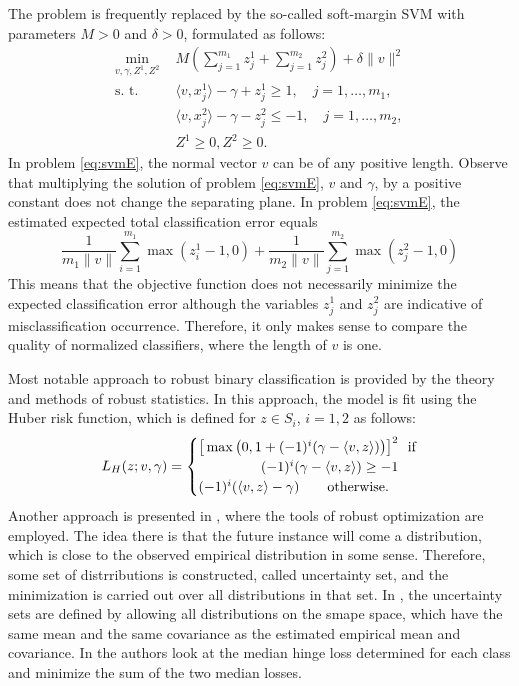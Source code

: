 \documentclass[10pt,letterpaper]{article}
\newcommand{\1}{1{\hskip -2.55 pt}\hbox{I}}
\begin{document}
The problem is frequently replaced by the so-called soft-margin SVM with parameters $M>0$ and $\delta>0$, formulated as follows:
\begin{equation}
\label{eq:svmE}
\begin{aligned}
\min_{v,\gamma,Z^1,Z^2}\, &\,  M \left( \sum_{j=1}^{m_1} z_j^1 + \sum_{j=1}^{m_2} z_j^2 \right)+\delta\|v\|^2  \\
\text{s. t. }\, & \, \langle v, x_j^1\rangle - \gamma + z_j^1 \ge 1, \quad j=1,\dots,m_1,\\
&\, \langle v, x_{j}^2\rangle -\gamma  - z_{j}^2 \le -1, \quad j=1,\dots,m_2,\\
&\, Z^1\ge 0, Z^2\geq 0.
\end{aligned}
\end{equation} 
In problem \eqref{eq:svmE}, the normal vector $v$ can be of any positive length. Observe that multiplying the solution of problem
\eqref{eq:svmE}, $v$ and $\gamma$, by a positive constant does not change the separating plane. 
In problem \eqref{eq:svmE}, the estimated expected total classification error equals
\[
 \frac{1}{m_1\|v\|} \sum_{i=1}^{m_1} \max (z_i^1-1, 0) + \frac{1}{m_2\|v\|} \sum_{j=1}^{m_2} \max (z_j^2-1, 0)
\]
This means that the objective function does not necessarily minimize the expected classification error although the variables $z^1_j$ and $z^2_j$ are indicative of misclassification occurrence. Therefore, it only makes sense to compare the quality of normalized classifiers, where the length of $v$ is one.


Most notable approach to robust binary classification is provided by the theory and methods of robust statistics. In this approach, the model is fit using the Huber risk function, which is defined for $z\in S_i$, $i=1,2$ as follows:
\begin{equation}
\label{Huberrf}
L_H(z; v,\gamma) = \begin{cases}
\big[\max \big(0, 1+(-1)^i(\gamma-\langle v, z\rangle) \big)\big]^2 &\!\!\text{if} \\
\hfill (-1)^i(\gamma-\langle v, z\rangle) \geq -1\\
(-1)^i(\langle v, z\rangle - \gamma) \qquad \text{otherwise.}
\end{cases}
\end{equation}
Another approach is presented in \cite{lanckriet2003robust,el2003robust}, where the tools of robust optimization are employed. The idea there is that the future instance will come a distribution, which is close to the observed empirical distribution in some sense. Therefore, some set of distrributions is constructed, called uncertainty set, and the minimization is carried out over all distributions in that set. In \cite{lanckriet2003robust,el2003robust}, the uncertainty sets are defined by allowing all distributions on the smape space, which have the same mean and the same covariance as the estimated empirical mean and covariance. 
In \cite{ma2011robust} the authors look at the median hinge loss determined for each class and minimize the sum of the two median losses.
\end{document}
